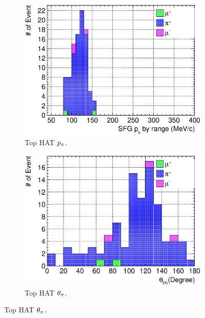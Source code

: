           \begin{figure}
               \centering
               \begin{subfigure}{\dbfigwid\textwidth}
                    \includegraphics[width=\textwidth]{figures/sel/sspi_TOP_pi_mombr_stack_al6_zoom.eps}
                    \caption{Top HAT $p_{\pi}$.}
                    \label{subfig:sppi-top-ppi}
               \end{subfigure}
               \begin{subfigure}{\dbfigwid\textwidth}
                    \includegraphics[width=\textwidth]{figures/sel/sspi_TOP_theta_trk_stack_al6_zoom.eps}
                    \caption{Top HAT $\theta_{\pi}$.}
                    \label{subfig:sppi-top-tpi}
               \end{subfigure}

\end{figure}
